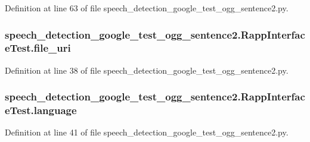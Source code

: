 Definition at line 63 of file speech\-\_\-detection\-\_\-google\-\_\-test\-\_\-ogg\-\_\-sentence2.\-py.

\hypertarget{classspeech__detection__google__test__ogg__sentence2_1_1RappInterfaceTest_a37b6ddb7e760edb7ad712086e3941b70}{
\subsubsection[{file\-\_\-uri}]{\setlength{\rightskip}{0pt plus 5cm}speech\-\_\-detection\-\_\-google\-\_\-test\-\_\-ogg\-\_\-sentence2.\-Rapp\-Interface\-Test.\-file\-\_\-uri}}\label{classspeech__detection__google__test__ogg__sentence2_1_1RappInterfaceTest_a37b6ddb7e760edb7ad712086e3941b70}


Definition at line 38 of file speech\-\_\-detection\-\_\-google\-\_\-test\-\_\-ogg\-\_\-sentence2.\-py.

\hypertarget{classspeech__detection__google__test__ogg__sentence2_1_1RappInterfaceTest_aaf1e0e8f7883912b566f85f221b40455}{
\subsubsection[{language}]{\setlength{\rightskip}{0pt plus 5cm}speech\-\_\-detection\-\_\-google\-\_\-test\-\_\-ogg\-\_\-sentence2.\-Rapp\-Interface\-Test.\-language}}\label{classspeech__detection__google__test__ogg__sentence2_1_1RappInterfaceTest_aaf1e0e8f7883912b566f85f221b40455}


Definition at line 41 of file speech\-\_\-detection\-\_\-google\-\_\-test\-\_\-ogg\-\_\-sentence2.\-py.

